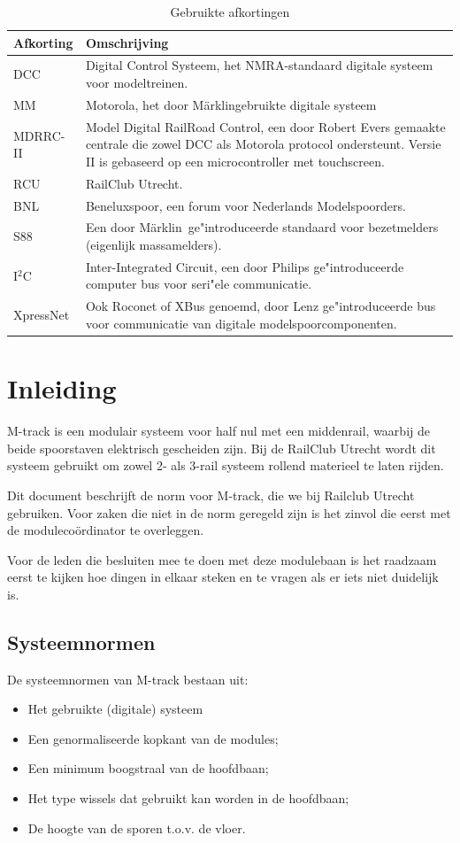 \documentclass[12pt,a4paper]{report}
\newcommand*{\marklin}{M\"{a}rklin}
\newcommand*{\isqc}{I$^{2}$C}
\begin{document}
\begin{table}[h!]
\begin{tabular}{| l |p{13cm}|}
\hline
\rowcolor[gray]{0.84}Afkorting & Omschrijving\\
\hline
DCC & Digital Control Systeem, het NMRA-standaard digitale systeem voor modeltreinen.\\
\hline
MM & Motorola, het door \marklin gebruikte digitale systeem\\
\hline
MDRRC-II&Model Digital RailRoad Control, een door Robert Evers gemaakte centrale die zowel DCC als Motorola protocol ondersteunt. Versie II is gebaseerd op een microcontroller met touchscreen.\\
\hline
RCU&RailClub Utrecht.\\
\hline
BNL&Beneluxspoor, een forum voor Nederlands Modelspoorders.\\
\hline
S88&Een door \marklin \ ge"{i}ntroduceerde standaard voor bezetmelders (eigenlijk massamelders).\\
\hline
\isqc &Inter-Integrated Circuit, een door Philips ge"{i}ntroduceerde computer bus voor seri"{e}le communicatie.\\
\hline
XpressNet&Ook Roconet of XBus genoemd, door Lenz ge"{i}ntroduceerde bus voor communicatie van digitale modelspoorcomponenten.\\
\hline
\end{tabular}
\caption{Gebruikte afkortingen}
\end{table}

\chapter{Inleiding}
\label{ch:normen}
M-track is een modulair systeem voor half nul met een middenrail, waarbij de beide spoorstaven elektrisch gescheiden zijn. Bij de RailClub Utrecht wordt dit systeem gebruikt om zowel 2- als 3-rail systeem rollend materieel te laten rijden.

Dit document beschrijft de norm voor M-track, die we bij Railclub Utrecht gebruiken. Voor zaken die niet in de norm geregeld zijn is het zinvol die eerst met de moduleco\"{o}rdinator te overleggen.

Voor de leden die besluiten mee te doen met deze modulebaan is het raadzaam eerst te kijken hoe dingen in elkaar steken en te vragen als er iets niet duidelijk is.

\section{Systeemnormen}
De systeemnormen van M-track bestaan uit:
\begin{itemize}
\item Het gebruikte (digitale) systeem
\item Een genormaliseerde kopkant van de modules;
\item Een minimum boogstraal van de hoofdbaan;
\item Het type wissels dat gebruikt kan worden in de hoofdbaan;
\item De hoogte van de sporen t.o.v. de vloer.
\end{itemize}
\end{document}
